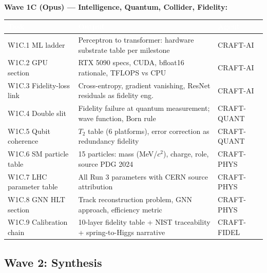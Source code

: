\documentclass[11pt,letterpaper]{article}
\newcommand{\tableheader}[1]{\textbf{\sffamily\textcolor{white}{#1}}}
\begin{document}
\textbf{Wave 1C (Opus) --- Intelligence, Quantum, Collider, Fidelity:}
\begin{center}
\begin{tabularx}{\textwidth}{L{2.2cm}XL{2.2cm}}
\toprule
{}
\tableheader{Task} & \tableheader{Output} & \tableheader{Agent} \\
\midrule
W1C.1 ML ladder & Perceptron to transformer: hardware substrate table per milestone & CRAFT-AI \\
W1C.2 GPU section & RTX 5090 specs, CUDA, bfloat16 rationale, TFLOPS vs CPU & CRAFT-AI \\
W1C.3 Fidelity-loss link & Cross-entropy, gradient vanishing, ResNet residuals as fidelity eng. & CRAFT-AI \\
W1C.4 Double slit & Fidelity failure at quantum measurement; wave function, Born rule & CRAFT-QUANT \\
W1C.5 Qubit coherence & $T_2$ table (6 platforms), error correction as redundancy fidelity & CRAFT-QUANT \\
W1C.6 SM particle table & 15 particles: mass (MeV/$c^2$), charge, role, source PDG 2024 & CRAFT-PHYS \\
W1C.7 LHC parameter table & All Run 3 parameters with CERN source attribution & CRAFT-PHYS \\
W1C.8 GNN HLT section & Track reconstruction problem, GNN approach, efficiency metric & CRAFT-PHYS \\
W1C.9 Calibration chain & 10-layer fidelity table + NIST traceability + spring-to-Higgs narrative & CRAFT-FIDEL \\
\bottomrule
\end{tabularx}
\end{center}

\subsection{Wave 2: Synthesis}
\end{document}
